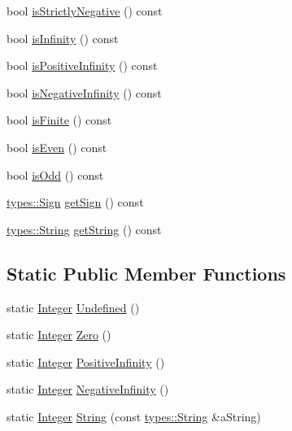 \begin{DoxyCompactItemize}
\item 
bool \hyperlink{classlibrary_1_1core_1_1types_1_1_integer_adaa9696b642dea4b9075b5a58e141958}{is\+Strictly\+Negative} () const
\item 
bool \hyperlink{classlibrary_1_1core_1_1types_1_1_integer_a99a5c50599c55929e11c7afae4a21709}{is\+Infinity} () const
\item 
bool \hyperlink{classlibrary_1_1core_1_1types_1_1_integer_a82713f4a7737cf59ad402bceb5f2017f}{is\+Positive\+Infinity} () const
\item 
bool \hyperlink{classlibrary_1_1core_1_1types_1_1_integer_ae7e2fcfb35272cf58b5e548a7702950c}{is\+Negative\+Infinity} () const
\item 
bool \hyperlink{classlibrary_1_1core_1_1types_1_1_integer_a892617aa8be82ac3c4e4dfb9129c7613}{is\+Finite} () const
\item 
bool \hyperlink{classlibrary_1_1core_1_1types_1_1_integer_a12f0f831be3e8a88c2e4ea250a9019e5}{is\+Even} () const
\item 
bool \hyperlink{classlibrary_1_1core_1_1types_1_1_integer_a4b403f5ac370a1f333c67fda7c54e1ed}{is\+Odd} () const
\item 
\hyperlink{namespacelibrary_1_1core_1_1types_a06d9eaa410d43a0fa3f383040618e87d}{types\+::\+Sign} \hyperlink{classlibrary_1_1core_1_1types_1_1_integer_abe567cca5d1e448329195df5d16d48e6}{get\+Sign} () const
\item 
\hyperlink{classlibrary_1_1core_1_1types_1_1_string}{types\+::\+String} \hyperlink{classlibrary_1_1core_1_1types_1_1_integer_a157230adc28642b992041ae299973ddc}{get\+String} () const
\end{DoxyCompactItemize}
\subsection*{Static Public Member Functions}
\begin{DoxyCompactItemize}
\item 
static \hyperlink{classlibrary_1_1core_1_1types_1_1_integer}{Integer} \hyperlink{classlibrary_1_1core_1_1types_1_1_integer_a142c2df49031b787daf30673c73fcad7}{Undefined} ()
\item 
static \hyperlink{classlibrary_1_1core_1_1types_1_1_integer}{Integer} \hyperlink{classlibrary_1_1core_1_1types_1_1_integer_a908c9b717859421a99d6d8c269685211}{Zero} ()
\item 
static \hyperlink{classlibrary_1_1core_1_1types_1_1_integer}{Integer} \hyperlink{classlibrary_1_1core_1_1types_1_1_integer_a807320f164c841288eafff5f49470c00}{Positive\+Infinity} ()
\item 
static \hyperlink{classlibrary_1_1core_1_1types_1_1_integer}{Integer} \hyperlink{classlibrary_1_1core_1_1types_1_1_integer_aa8151c3b615012ec215d20da6de593bd}{Negative\+Infinity} ()
\item 
static \hyperlink{classlibrary_1_1core_1_1types_1_1_integer}{Integer} \hyperlink{classlibrary_1_1core_1_1types_1_1_integer_af4d25f6f706e8a4a6b2ec97b506e940a}{String} (const \hyperlink{classlibrary_1_1core_1_1types_1_1_string}{types\+::\+String} \&a\+String)
\end{DoxyCompactItemize}
